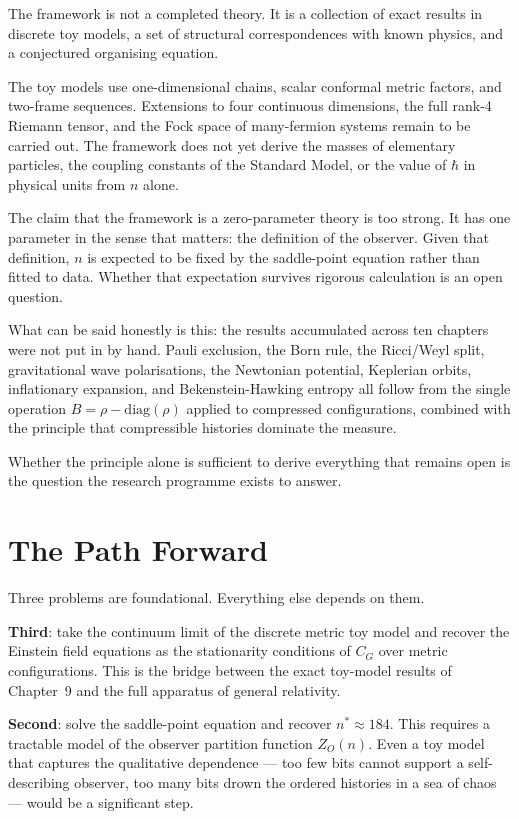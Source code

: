 The framework is not a completed theory. It is a collection of exact
results in discrete toy models, a set of structural correspondences
with known physics, and a conjectured organising equation.

The toy models use one-dimensional chains, scalar conformal metric
factors, and two-frame sequences. Extensions to four continuous
dimensions, the full rank-4 Riemann tensor, and the Fock space of
many-fermion systems remain to be carried out. The framework does not
yet derive the masses of elementary particles, the coupling constants
of the Standard Model, or the value of $\hbar$ in physical units from
$n$ alone.

The claim that the framework is a zero-parameter theory is too strong.
It has one parameter in the sense that matters: the definition of the
observer. Given that definition, $n$ is expected to be fixed by the
saddle-point equation rather than fitted to data. Whether that
expectation survives rigorous calculation is an open question.

What can be said honestly is this: the results accumulated across ten
chapters were not put in by hand. Pauli exclusion, the Born rule, the
Ricci/Weyl split, gravitational wave polarisations, the Newtonian
potential, Keplerian orbits, inflationary expansion, and
Bekenstein-Hawking entropy all follow from the single operation
$B = \rho - \mathrm{diag}(\rho)$ applied to compressed configurations,
combined with the principle that compressible histories dominate the
measure.

Whether the principle alone is sufficient to derive everything
that remains open is the question the research programme exists to
answer.

\section{The Path Forward}

Three problems are foundational. Everything else depends on them.

\textbf{Third}: take the continuum limit of the discrete metric toy
model and recover the Einstein field equations as the stationarity
conditions of $C_G$ over metric configurations. This is the bridge
between the exact toy-model results of Chapter~9 and the full
apparatus of general relativity.

\textbf{Second}: solve the saddle-point equation and recover $n^*
\approx 184$. This requires a tractable model of the observer partition
function $Z_O(n)$. Even a toy model that captures the qualitative
dependence --- too few bits cannot support a self-describing observer,
too many bits drown the ordered histories in a sea of chaos --- would
be a significant step.

